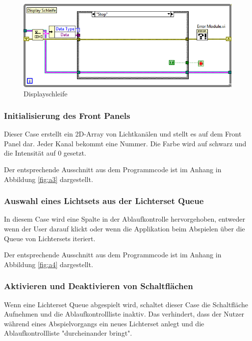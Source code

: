 	\begin{figure}[h!]
	\centering
		\includegraphics[width=\textwidth]{Pics/front-stop.png}
	\caption{Displayschleife}
	\label{fig:disp}
	\end{figure}


\subsubsection{Initialisierung des Front Panels}
Dieser Case erstellt ein 2D-Array von Lichtkanälen und stellt es auf dem Front Panel dar. Jeder Kanal bekommt eine Nummer. Die Farbe wird auf schwarz und die Intensität auf 0 gesetzt. 

Der entsprechende Ausschnitt aus dem Programmcode ist im Anhang in Abbildung \ref{fig:a3} dargestellt.

\subsubsection{Auswahl eines Lichtsets aus der Lichterset Queue}
In diesem Case wird eine Spalte in der Ablaufkontrolle hervorgehoben, entweder wenn der User darauf klickt oder wenn die Applikation beim Abspielen über die Queue von Lichtersets iteriert. 

Der entsprechende Ausschnitt aus dem Programmcode ist im Anhang in Abbildung \ref{fig:a4} dargestellt.
 
\subsubsection{Aktivieren und Deaktivieren von Schaltflächen}
Wenn eine Lichterset Queue abgespielt wird, schaltet dieser Case die Schaltfläche Aufnehmen und die Ablaufkontrollliste inaktiv. 
Das verhindert, dass der Nutzer während eines Abspielvorgangs ein neues Lichterset anlegt und die Ablaufkontrollliste "durcheinander bringt".

